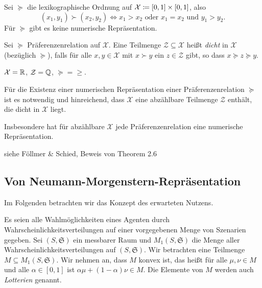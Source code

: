 \documentclass[a4paper,twoside,DIV15,BCOR12mm]{scrbook}
\newcommand{\cX}{\mathcal X}
\begin{document}
\begin{beispiel}
Sei $\succeq$ die lexikographische Ordnung auf $\cX \da [0, 1]\times[0, 1]$, also\[(x_1,y_1)\succ (x_2,y_2) \iff x_1 > x_2 \text{ oder } x_1 = x_2 \text{ und } y_1 > y_2.\] Für $\succeq$ gibt es keine numerische Repräsentation.
\end{beispiel}

\begin{definition}
Sei $\succeq$ Präferenzenrelation auf $\cX$. Eine Teilmenge $\mathcal Z\subseteq \mathcal X$ heißt \emph{dicht} in $\cX$ (bezüglich $\succeq$), falls für alle $x,y\in\cX$ mit $x\succ y$ ein $z\in\mathcal Z$ gibt, so dass $x\succeq z \succeq y$.
\end{definition}

\begin{beispiel}
$\cX = \MdR$, $\mathcal Z=\mathbb{Q}$, $\succeq = \ge$.
\end{beispiel}

\begin{satz}
Für die Existenz einer numerischen Repräsentation einer Präferenzenrelation $\succeq$ ist es notwendig und hinreichend, dass $\cX$ eine abzählbare Teilmenge $\mathcal Z$ enthält, die dicht in $\cX$ liegt.

Insbesondere hat für abzählbare $\cX$ jede Präferenzenrelation eine numerische Repräsentation.
\end{satz}

\begin{beweis}
siehe Föllmer \& Schied, Beweis von Theorem 2.6
\end{beweis}

\subsection{Von Neumann-Morgenstern-Repräsentation}

Im Folgenden betrachten wir das Konzept des erwarteten Nutzens.

Es seien alle Wahlmöglichkeiten eines Agenten durch Wahrscheinlichkeitsverteilungen auf einer vorgegebenen Menge von Szenarien gegeben. Sei $(S,\mathfrak S)$ ein messbarer Raum und $M_1(S,\mathfrak S)$ die Menge aller Wahrscheinlichkeitsverteilungen auf $(S,\mathfrak S)$. Wir betrachten eine Teilmenge $M\subseteq M_1(S,\mathfrak S)$. Wir nehmen an, dass $M$ konvex ist, das heißt für alle $\mu, \nu\in M$ und alle $\alpha\in[0, 1]$ ist $\alpha\mu + (1-\alpha)\nu \in M$. Die Elemente von $M$ werden auch \emph{Lotterien} genannt.
\end{document}
